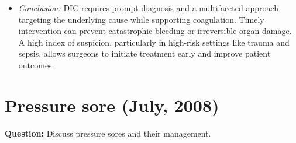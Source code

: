 \documentclass{article}
\begin{document}
\begin{itemize}
\item \emph{Conclusion:} DIC requires prompt diagnosis and a multifaceted approach targeting the underlying cause while supporting coagulation. Timely intervention can prevent catastrophic bleeding or irreversible organ damage. A high index of suspicion, particularly in high-risk settings like trauma and sepsis, allows surgeons to initiate treatment early and improve patient outcomes.


\end{itemize}

\section{Pressure sore (July, 2008)}

\textbf{Question:} Discuss pressure sores and their management.
\end{document}
